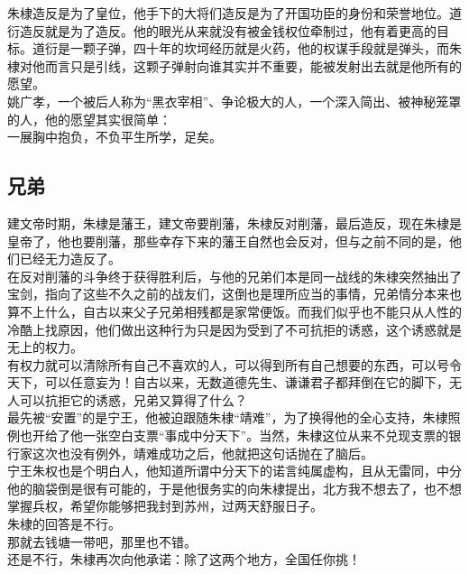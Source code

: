 \begin{multicols}{\theparacolNo}
朱棣造反是为了皇位，他手下的大将们造反是为了开国功臣的身份和荣誉地位。道衍造反就是为了造反。他的眼光从来就没有被金钱权位牵制过，他有着更高的目标。道衍是一颗子弹，四十年的坎坷经历就是火药，他的权谋手段就是弹头，而朱棣对他而言只是引线，这颗子弹射向谁其实并不重要，能被发射出去就是他所有的愿望。\\

姚广孝，一个被后人称为“黑衣宰相”、争论极大的人，一个深入简出、被神秘笼罩的人，他的愿望其实很简单：\\

一展胸中抱负，不负平生所学，足矣。\\

\subsection{兄弟}
建文帝时期，朱棣是藩王，建文帝要削藩，朱棣反对削藩，最后造反，现在朱棣是皇帝了，他也要削藩，那些幸存下来的藩王自然也会反对，但与之前不同的是，他们已经无力造反了。\\

在反对削藩的斗争终于获得胜利后，与他的兄弟们本是同一战线的朱棣突然抽出了宝剑，指向了这些不久之前的战友们，这倒也是理所应当的事情，兄弟情分本来也算不上什么，自古以来父子兄弟相残都是家常便饭。而我们似乎也不能只从人性的冷酷上找原因，他们做出这种行为只是因为受到了不可抗拒的诱惑，这个诱惑就是无上的权力。\\

有权力就可以清除所有自己不喜欢的人，可以得到所有自己想要的东西，可以号令天下，可以任意妄为！自古以来，无数道德先生、谦谦君子都拜倒在它的脚下，无人可以抗拒它的诱惑，兄弟又算得了什么？\\

最先被“安置”的是宁王，他被迫跟随朱棣“靖难”，为了换得他的全心支持，朱棣照例也开给了他一张空白支票“事成中分天下”。当然，朱棣这位从来不兑现支票的银行家这次也没有例外，靖难成功之后，他就把这句话抛在了脑后。\\

宁王朱权也是个明白人，他知道所谓中分天下的诺言纯属虚构，且从无雷同，中分他的脑袋倒是很有可能的，于是他很务实的向朱棣提出，北方我不想去了，也不想掌握兵权，希望你能够把我封到苏州，过两天舒服日子。\\

朱棣的回答是不行。\\

那就去钱塘一带吧，那里也不错。\\

还是不行，朱棣再次向他承诺：除了这两个地方，全国任你挑！\\


\end{multicols}
